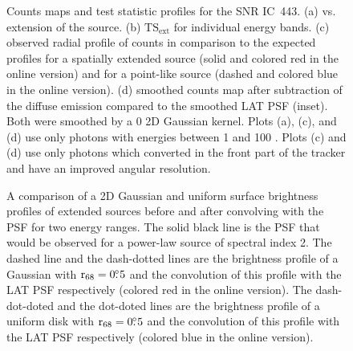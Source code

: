 \documentclass[12pt,preprint]{aastex}
\newif\ifcolorfigure
\newcommand{\gev}{\text{GeV}\xspace}
\newcommand{\tsext}{{\ensuremath{\text{TS}_{\text{ext}}}}\xspace}
\newcommand{\rsixeight}{{\ensuremath{\text{r}_{68}}}\xspace}
\newcommand{\ts}{\text{TS}\xspace}
\begin{document}


\clearpage
\begin{figure}
    \ifcolorfigure
    \plotone{ic443_plots/four_plots_ic443_color.eps}
    \else
    \fi
    \caption{
    Counts maps and test statistic profiles for the SNR IC~443. (a) \ts
    vs. extension of the source. (b) \tsext for individual energy
    bands. (c) observed radial profile of counts in comparison to the
    expected profiles for a spatially extended source (solid and colored
    red in the online version) and for a point-like source (dashed and colored
    blue in the online version).  (d) smoothed counts map after subtraction
    of the diffuse emission compared to the smoothed
    LAT PSF (inset). Both were smoothed by a 0 2D Gaussian kernel.
    Plots (a),
    (c), and (d) use only 
    photons with energies between
    1 \gev and 100 \gev.  Plots (c) and (d) use
    only photons which converted in the front part of the tracker and
    have an improved angular resolution.
    }
    \label{four_plots_ic443}
\end{figure}

\clearpage
\begin{figure}
    \ifcolorfigure
      \plotone{mc_plots/compare_disk_gauss_color.eps}
    \else
    \fi
    \caption{
    A comparison of a 2D Gaussian and uniform surface brightness profiles
    of extended sources before and after convolving with the PSF for two
    energy ranges.  The solid black line is the PSF that would be observed
    for a power-law source of spectral index 2. The dashed line
    and the dash-dotted lines are 
    the brightness profile of a Gaussian with $\rsixeight=0\fdg5$
    and the convolution of this profile with the LAT PSF respectively
    (colored red in the online version).
    The dash-dot-doted and the dot-doted lines are the brightness profile
    of a uniform disk with $\rsixeight=0\fdg5$ and the convolution
    of this profile with the LAT PSF respectively (colored blue in the online version).
    }\label{compare_disk_gauss}
  \end{figure}
\end{document}
